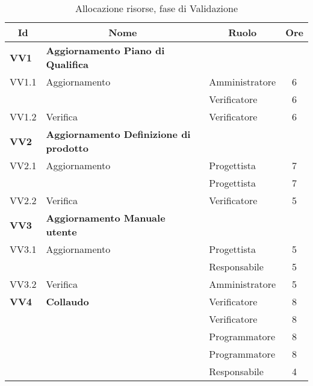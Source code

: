 \begin{table}[H]
	\centering
	\begin{tabular}{ l l l c  }
	\hline
	\multicolumn{1}{c}{\textbf{Id}} & 
	\multicolumn{1}{c}{\textbf{Nome}} & 
	\multicolumn{1}{c}{\textbf{Ruolo}}& 
	\multicolumn{1}{c}{\textbf{Ore}} \\
	\hline
	\textbf{VV1} & \textbf{Aggiornamento Piano di Qualifica} \\
	\cline{3-4}
	VV1.1 & Aggiornamento  & Amministratore & 6\\ 
	 & & Verificatore & 6\\
    \cline{3-4}
	VV1.2 & Verifica & Verificatore &  6\\
	\hline
	\textbf{VV2} & \textbf{Aggiornamento Definizione di prodotto} \\
	\cline{3-4}
	VV2.1 & Aggiornamento  & Progettista & 7\\ 
	 & & Progettista & 7\\
    \cline{3-4}
	VV2.2 & Verifica & Verificatore &  5\\
	\hline
	\textbf{VV3} & \textbf{Aggiornamento Manuale utente} \\
	\cline{3-4}
	VV3.1 & Aggiornamento  & Progettista & 5\\ 
	 & & Responsabile & 5\\
    \cline{3-4}
	VV3.2 & Verifica & Amministratore &  5\\
	\hline
	\textbf{VV4} & \textbf{Collaudo} & Verificatore & 8\\
	 & & Verificatore & 8\\
	 & & Programmatore & 8\\
	 & & Programmatore & 8\\
	 & & Responsabile & 4\\
	\hline
	\end{tabular}
	\caption{Allocazione risorse, fase di Validazione}
	\end{table}	
	
	